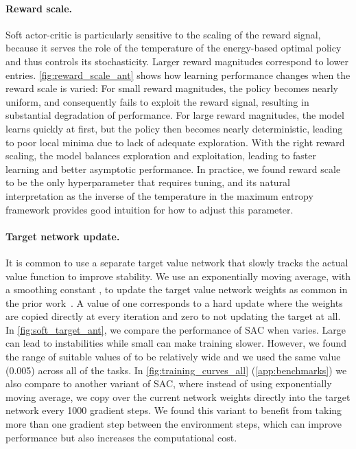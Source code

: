 \documentclass{article}
\begin{document}
\vspace{-0.1in}
\paragraph{Reward scale.} Soft actor-critic is particularly sensitive to the scaling of the reward signal, because it serves the role of the temperature of the energy-based optimal policy and thus controls its stochasticity. Larger reward magnitudes correspond to lower entries. \autoref{fig:reward_scale_ant} shows how learning performance changes when the reward scale is varied: For small reward magnitudes, the policy becomes nearly uniform, and consequently fails to exploit the reward signal, resulting in substantial degradation of performance. For large reward magnitudes, the model learns quickly at first, but the policy then becomes nearly deterministic, leading to poor local minima due to lack of adequate exploration. With the right reward scaling, the model balances exploration and exploitation, leading to faster learning and better asymptotic performance. In practice, we found reward scale to be the only hyperparameter that requires tuning, and its natural interpretation as the inverse of the temperature in the maximum entropy framework provides good intuition for how to adjust this parameter.


\vspace{-0.1in}
\paragraph{Target network update.} It is common to use a separate target value network that slowly tracks the actual value function to improve stability. We use an exponentially moving average, with a smoothing constant , to update the target value network weights as common in the prior work~\cite{lillicrap2015continuous,mnih2015human}. A value of one corresponds to a hard update where the weights are copied directly at every iteration and zero to not updating the target at all. In \autoref{fig:soft_target_ant}, we compare the performance of SAC when  varies. Large  can lead to instabilities while small  can make training slower. However, we found the range of suitable values of  to be relatively wide and we used the same value (0.005) across all of the tasks. In \autoref{fig:training_curves_all} (\autoref{app:benchmarks}) we also compare to another variant of SAC, where instead of using exponentially moving average, we copy over the current network weights directly into the target network every 1000 gradient steps. We found this variant to benefit from taking more than one gradient step between the environment steps, which can improve performance but also increases the computational cost.
\end{document}
